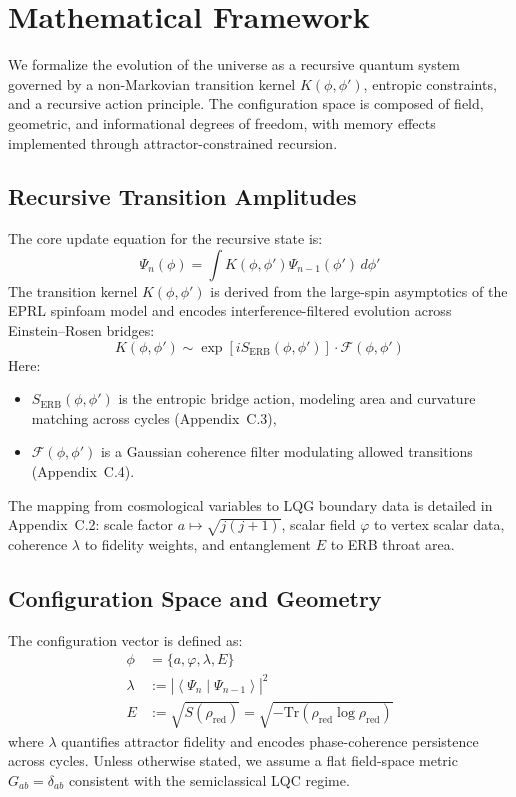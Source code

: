 \section{Mathematical Framework}
\label{sec:mathematical-framework}

We formalize the evolution of the universe as a recursive quantum system governed by a non-Markovian transition kernel \( K(\phi, \phi') \), entropic constraints, and a recursive action principle. The configuration space is composed of field, geometric, and informational degrees of freedom, with memory effects implemented through attractor-constrained recursion.

\subsection{Recursive Transition Amplitudes}

The core update equation for the recursive state is:
\begin{equation}
\Psi_n(\phi) = \int K(\phi, \phi') \Psi_{n-1}(\phi') \, d\phi'
\end{equation}
The transition kernel \( K(\phi, \phi') \) is derived from the large-spin asymptotics of the EPRL spinfoam model and encodes interference-filtered evolution across Einstein–Rosen bridges:
\begin{equation}
K(\phi, \phi') \sim \exp\left[i S_{\text{ERB}}(\phi, \phi')\right] \cdot \mathcal{F}(\phi, \phi')
\end{equation}
Here:
\begin{itemize}
    \item \( S_{\text{ERB}}(\phi, \phi') \) is the entropic bridge action, modeling area and curvature matching across cycles (Appendix~C.3),
    \item \( \mathcal{F}(\phi, \phi') \) is a Gaussian coherence filter modulating allowed transitions (Appendix~C.4).
\end{itemize}
The mapping from cosmological variables to LQG boundary data is detailed in Appendix~C.2: scale factor \( a \mapsto \sqrt{j(j+1)} \), scalar field \( \varphi \) to vertex scalar data, coherence \( \lambda \) to fidelity weights, and entanglement \( E \) to ERB throat area.

\subsection{Configuration Space and Geometry}

The configuration vector is defined as:
\begin{align}
\phi &= \{a, \varphi, \lambda, E\} \\
\lambda &:= \left| \left\langle \Psi_n \middle| \Psi_{n-1} \right\rangle \right|^2 \\
E &:= \sqrt{S(\rho_{\text{red}})} = \sqrt{-\mathrm{Tr}(\rho_{\text{red}} \log \rho_{\text{red}})}
\end{align}
where \( \lambda \) quantifies attractor fidelity and encodes phase-coherence persistence across cycles. Unless otherwise stated, we assume a flat field-space metric \( G_{ab} = \delta_{ab} \) consistent with the semiclassical LQC regime.

